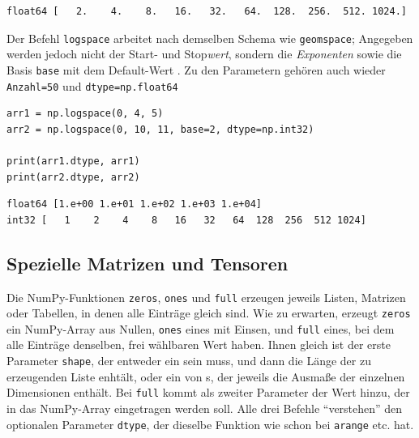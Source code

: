 \begin{cmdbox}
\begin{verbatim}
float64 [   2.    4.    8.   16.   32.   64.  128.  256.  512. 1024.]
\end{verbatim}
\end{cmdbox}

Der Befehl \texttt{logspace} arbeitet nach demselben Schema wie \texttt{geomspace}; Angegeben werden jedoch nicht der Start- und Stop\emph{wert}, sondern die \emph{Exponenten} sowie die Basis \texttt{base} mit dem Default-Wert . Zu den Parametern gehören auch wieder \texttt{Anzahl=50} und \texttt{dtype=np.float64}

\begin{codebox}
\begin{verbatim}
arr1 = np.logspace(0, 4, 5)
arr2 = np.logspace(0, 10, 11, base=2, dtype=np.int32)

print(arr1.dtype, arr1)
print(arr2.dtype, arr2)
\end{verbatim}
\end{codebox}

\begin{cmdbox}
\begin{verbatim}
float64 [1.e+00 1.e+01 1.e+02 1.e+03 1.e+04]
int32 [   1    2    4    8   16   32   64  128  256  512 1024]
\end{verbatim}
\end{cmdbox}

\subsection{Spezielle Matrizen und Tensoren}
Die NumPy-Funktionen \texttt{zeros}, \texttt{ones} und \texttt{full} erzeugen jeweils Listen, Matrizen oder Tabellen, in denen alle Einträge gleich sind. Wie zu erwarten, erzeugt \texttt{zeros} ein NumPy-Array aus Nullen, \texttt{ones} eines mit Einsen, und \texttt{full} eines, bei dem alle Einträge denselben, frei wählbaren Wert haben. Ihnen gleich ist der erste Parameter \texttt{shape}, der entweder ein  sein muss, und dann die Länge der zu erzeugenden Liste enhtält, oder ein  von s, der jeweils die Ausmaße der einzelnen Dimensionen enthält. Bei \texttt{full} kommt als zweiter Parameter der Wert hinzu, der in das NumPy-Array eingetragen werden soll. Alle drei Befehle \enquote{verstehen} den optionalen Parameter \texttt{dtype}, der dieselbe Funktion wie schon bei \texttt{arange} etc. hat.

